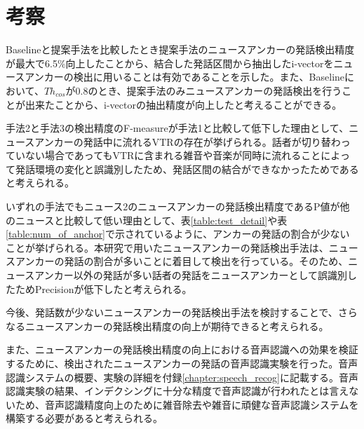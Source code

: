 \section{考察}
Baselineと提案手法を比較したとき提案手法のニュースアンカーの発話検出精度が最大で6.5\%向上したことから、結合した発話区間から抽出したi-vectorをニュースアンカーの検出に用いることは有効であることを示した。また、Baselineにおいて、$Th_{cos}$が0.8のとき、提案手法のみニュースアンカーの発話検出を行うことが出来たことから、i-vectorの抽出精度が向上したと考えることができる。\par
手法2と手法3の検出精度のF-measureが手法1と比較して低下した理由として、ニュースアンカーの発話中に流れるVTRの存在が挙げられる。話者が切り替わっていない場合であってもVTRに含まれる雑音や音楽が同時に流れることによって発話環境の変化と誤識別したため、発話区間の結合ができなかったためであると考えられる。\par
いずれの手法でもニュース2のニュースアンカーの発話検出精度であるP値が他のニュースと比較して低い理由として、表\ref{table:test_detail}や表\ref{table:num_of_anchor}で示されているように、アンカーの発話の割合が少ないことが挙げられる。本研究で用いたニュースアンカーの発話検出手法\cite{nozaki_gakuseikai}は、ニュースアンカーの発話の割合が多いことに着目して検出を行っている。そのため、ニュースアンカー以外の発話が多い話者の発話をニュースアンカーとして誤識別したためPrecisionが低下したと考えられる。\par
今後、発話数が少ないニュースアンカーの発話検出手法を検討することで、さらなるニュースアンカーの発話検出精度の向上が期待できると考えられる。\par
また、ニュースアンカーの発話検出精度の向上における音声認識への効果を検証するために、検出されたニュースアンカーの発話の音声認識実験を行った。音声認識システムの概要、実験の詳細を付録\ref{chapter:speech_recog}に記載する。音声認識実験の結果、インデクシングに十分な精度で音声認識が行われたとは言えないため、音声認識精度向上のために雑音除去や雑音に頑健な音声認識システムを構築する必要があると考えられる。
